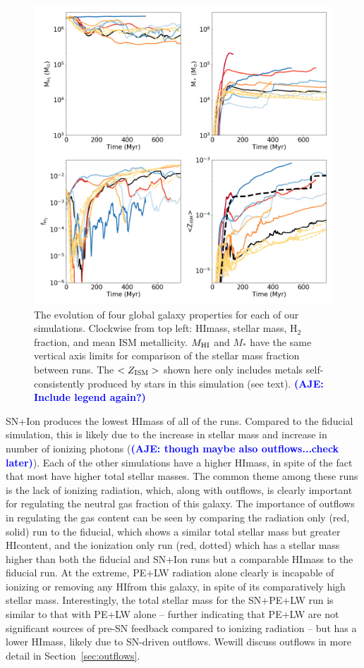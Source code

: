 \documentclass[twocolumn]{aastex62}
\newcommand{\radstyle}{red, solid}
\newcommand{\ionstyle}{red, dotted}
\newcommand{\HI}{HI}
\newcommand{\aje}[1]{\textcolor{blue}{\textbf{(AJE: #1)}}}
\begin{document}
\begin{figure}
  \centering
  \includegraphics[width=0.98\linewidth]{figures/physics_comparison_masses}
  \caption{The evolution of four global galaxy properties for each of our simulations. Clockwise from top left: \HI mass, stellar mass, H$_2$ fraction, and mean ISM metallicity. $M_{\rm \HI}$ and $M_{*}$ have the same vertical axis limits for comparison of the stellar mass fraction between runs. The $<Z_{\rm ISM}>$ shown here only includes metals self-consistently produced by stars in this simulation (see text).
  \aje{Include legend again?}}
  \label{fig:properties}
\end{figure}

SN+Ion produces the lowest \HI mass of all of the runs. Compared to the fiducial simulation, this is likely due to the increase in stellar mass and increase in number of ionizing photons (\aje{though maybe also outflows...check later}). Each of the other simulations have a higher \HI mass, in spite of the fact that most have higher total stellar masses. The common theme among these runs is the lack of ionizing radiation, which, along with outflows, is clearly important for regulating the neutral gas fraction of this galaxy. The importance of outflows in regulating the gas content can be seen by comparing the radiation only (\radstyle) run to the fiducial, which shows a similar total stellar mass but greater \HI content, and the ionization only run (\ionstyle) which has a stellar mass higher than both the fiducial and SN+Ion runs but a comparable \HI mass to the fiducial run. At the extreme, PE+LW radiation alone clearly is incapable of ionizing or removing any \HI from this galaxy, in spite of its comparatively high stellar mass. Interestingly, the total stellar mass for the SN+PE+LW run is similar to that with PE+LW alone -- further indicating that PE+LW are not significant sources of pre-SN feedback compared to ionizing radiation -- but has a lower \HI mass, likely due to SN-driven outflows. Wewill discuss outflows in more detail in Section~\ref{sec:outflows}.
\end{document}
